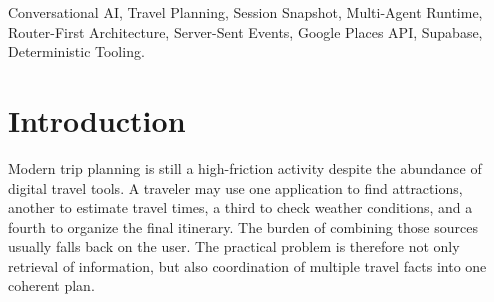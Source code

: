\documentclass[conference]{IEEEtran}
\begin{document}
\begin{abstract}
Travel planning remains fragmented across maps, reviews, weather pages, booking searches, and conversational assistants. Many recent systems respond with fluent text but still leave itinerary consistency, route feasibility, and state persistence unresolved. This paper presents \textit{Roameo}, a conversational travel-planning workspace built around a router-first runtime, deterministic tool execution, and one canonical session snapshot shared across chat, itinerary, map, and saved places. The current system uses a lightweight fast path for trivial turns, a semantic intent resolver for travel understanding, direct grounding through Google Places and related travel APIs, structured itinerary synthesis for planning turns, deterministic feasibility and transit passes, and final narrative generation over the updated canonical state. The implementation combines a Next.js frontend, an Express backend, authenticated Server-Sent Events for live updates, and Supabase-backed persistence. Unlike the earlier project architecture, the current design does not rely on a monolithic travel agent or parallel truth systems. Instead, it separates semantic understanding from deterministic mutations and commits all important artifacts through session-scoped persistence. The result is a practical full-stack architecture for travel planning in which route logic, place discovery, and conversational responses remain synchronized across multiple turns.
\end{abstract}

\begin{IEEEkeywords}
Conversational AI, Travel Planning, Session Snapshot, Multi-Agent Runtime, Router-First Architecture, Server-Sent Events, Google Places API, Supabase, Deterministic Tooling.
\end{IEEEkeywords}

\section{Introduction}

Modern trip planning is still a high-friction activity despite the abundance of digital travel tools. A traveler may use one application to find attractions, another to estimate travel times, a third to check weather conditions, and a fourth to organize the final itinerary. The burden of combining those sources usually falls back on the user. The practical problem is therefore not only retrieval of information, but also coordination of multiple travel facts into one coherent plan.
\end{document}
